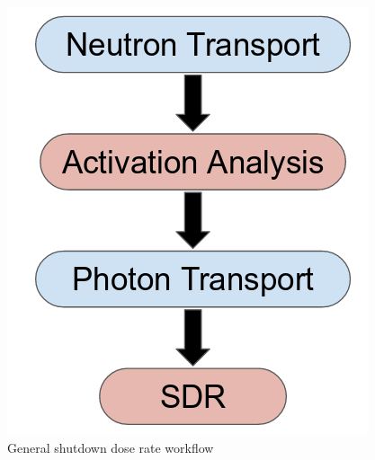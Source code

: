 \begin{figure}[h!]
\begin{centering}
\includegraphics[scale=0.3]{../figs/r2s.png}
\caption{General shutdown dose rate workflow}
\label{r2s}
\end{centering}
\end{figure}

